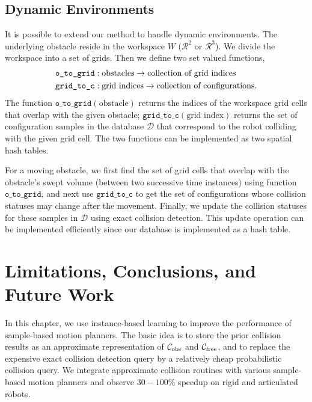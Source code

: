 \subsection{Dynamic Environments}
It is possible to extend our method to handle dynamic environments. The underlying obstacle reside in the workspace $W$ ($\mathcal R^2$ or $\mathcal R^3$). We divide the workspace into a set of grids. Then we define two set valued functions,
\begin{align}
\texttt{o\_to\_grid}&: \text{obstacles} \rightarrow \text{collection of grid indices} \notag \\
\texttt{grid\_to\_c}&: \text{grid indices} \rightarrow \text{collection of configurations}. \notag
\end{align}
The function $\texttt{o\_to\_grid}(\text{obstacle})$ returns the indices of the workspace grid cells that overlap with the given obstacle; $\texttt{grid\_to\_c}(\text{grid index})$ returns the set of configuration samples in the database $\mathcal D$ that correspond to the robot colliding with the given grid cell. The two functions can be implemented as two spatial hash tables.

For a moving obstacle, we first find the set of grid cells that overlap with the obstacle's swept volume (between two successive time instances) using function $\texttt{o\_to\_grid}$, and next use $\texttt{grid\_to\_c}$ to get the set of configurations whose collision statuses may change after the movement. Finally, we update the collision statuses for these samples in $\mathcal D$ using exact collision detection. This update operation can be implemented efficiently since our database is implemented as a hash table.


\section{Limitations, Conclusions, and Future Work}

In this chapter, we use instance-based learning to improve the performance of sample-based motion planners. The basic idea is to store the prior collision results as an approximate representation of $\mathcal C_{\text{obs}}$ and $\mathcal C_{\text{free}}$, and to replace the expensive exact collision detection query by a relatively cheap probabilistic collision query. We integrate approximate collision routines with various sample-based motion planners and observe $30-100\%$ speedup on rigid and articulated robots.

